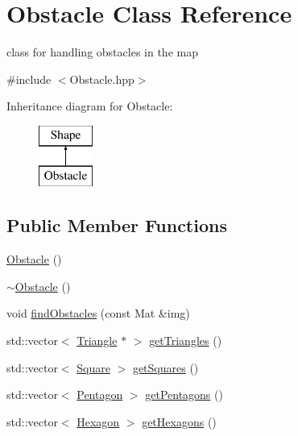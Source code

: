 \hypertarget{class_obstacle}{}\section{Obstacle Class Reference}
\label{class_obstacle}


class for handling obstacles in the map  




{\ttfamily \#include $<$Obstacle.\+hpp$>$}

Inheritance diagram for Obstacle\+:\begin{figure}[H]
\begin{center}
\leavevmode
\includegraphics[height=2.000000cm]{class_obstacle}
\end{center}
\end{figure}
\subsection*{Public Member Functions}
\begin{DoxyCompactItemize}
\item 
\mbox{\hyperlink{class_obstacle_a8f734072321fa06a7b7dae2d5f50f352}{Obstacle}} ()
\item 
\mbox{\hyperlink{class_obstacle_af2f9cc9c6cff75dca0974fd5ac4f71a9}{$\sim$\+Obstacle}} ()
\item 
void \mbox{\hyperlink{class_obstacle_ae333b23b742b38e50be13bc7aec2da5b}{find\+Obstacles}} (const Mat \&img)
\item 
std\+::vector$<$ \mbox{\hyperlink{class_triangle}{Triangle}} $\ast$ $>$ \mbox{\hyperlink{class_obstacle_ae4541d52e558b0995203e99d09d4d5d6}{get\+Triangles}} ()
\item 
std\+::vector$<$ \mbox{\hyperlink{class_square}{Square}} $>$ \mbox{\hyperlink{class_obstacle_a53daef38dbe68e85696abc8ed03cf4b2}{get\+Squares}} ()
\item 
std\+::vector$<$ \mbox{\hyperlink{class_pentagon}{Pentagon}} $>$ \mbox{\hyperlink{class_obstacle_a2a3f85aa41ff39922c3994154fa8a7c1}{get\+Pentagons}} ()
\item 
std\+::vector$<$ \mbox{\hyperlink{class_hexagon}{Hexagon}} $>$ \mbox{\hyperlink{class_obstacle_a472a93843d84f1275c5b9cd57aa53850}{get\+Hexagons}} ()
\end{DoxyCompactItemize}


